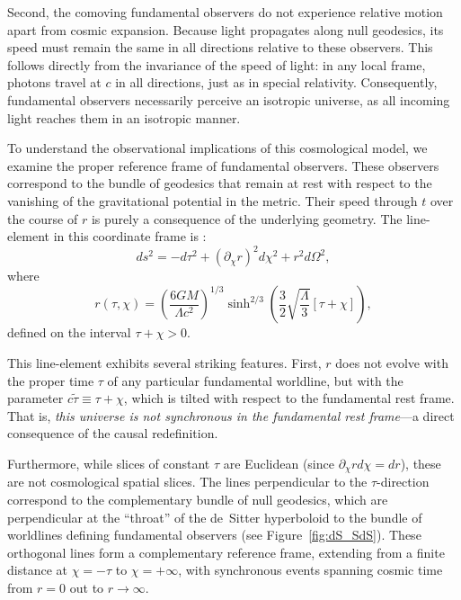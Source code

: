 \documentclass[12pt]{book}
\begin{document}
Second, the comoving fundamental observers do not experience relative motion apart from cosmic expansion. Because light propagates along null geodesics, its speed must remain the same in all directions relative to these observers. This follows directly from the invariance of the speed of light: in any local frame, photons travel at $c$ in all directions, just as in special relativity. Consequently, fundamental observers necessarily perceive an isotropic universe, as all incoming light reaches them in an isotropic manner.

To understand the observational implications of this cosmological model, we examine the proper reference frame of fundamental observers. These observers correspond to the bundle of geodesics that remain at rest with respect to the vanishing of the gravitational potential in the metric. Their speed through $t$ over the course of $r$ is purely a consequence of the underlying geometry. The line-element in this coordinate frame is \cite{Janzen2015}:
\begin{equation}
    ds^2=-d\tau^2+(\partial_{\chi}r)^2d\chi^2+r^2d\Omega^2,\label{eq:SdS_flat}
\end{equation}
where
\begin{equation}
    r(\tau,\chi)=\left(\frac{6GM}{\Lambda c^2}\right)^{1/3}\sinh^{2/3}\left(\frac{3}{2}\sqrt{\frac{\Lambda}{3}}[\tau+\chi]\right),\label{eq:r_SdS}
\end{equation}
defined on the interval $\tau+\chi>0$.

This line-element exhibits several striking features. First, $r$ does not evolve with the proper time $\tau$ of any particular fundamental worldline, but with the parameter $c\tilde{\tau}\equiv\tau+\chi$, which is tilted with respect to the fundamental rest frame. That is, \textit{this universe is not synchronous in the fundamental rest frame}---a direct consequence of the causal redefinition.

Furthermore, while slices of constant $\tau$ are Euclidean (since $\partial_{\chi}rd\chi=dr$), these are not cosmological spatial slices. The lines perpendicular to the $\tau$-direction correspond to the complementary bundle of null geodesics, which are perpendicular at the ``throat'' of the de~Sitter hyperboloid to the bundle of worldlines defining fundamental observers (see Figure~\ref{fig:dS_SdS}). These orthogonal lines form a complementary reference frame, extending from a finite distance at $\chi=-\tau$ to $\chi=+\infty$, with synchronous events spanning cosmic time from $r=0$ out to $r\rightarrow\infty$. 
\end{document}
